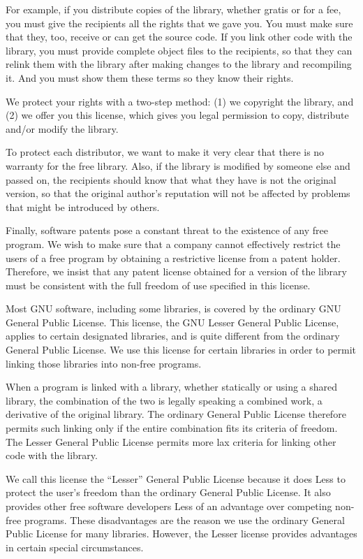 \documentclass[]{article}
\begin{document}
For example, if you distribute copies of the library, whether gratis or
for a fee, you must give the recipients all the rights that we gave you.
You must make sure that they, too, receive or can get the source code.
If you link other code with the library, you must provide complete
object files to the recipients, so that they can relink them with the
library after making changes to the library and recompiling it. And you
must show them these terms so they know their rights.

We protect your rights with a two-step method: (1) we copyright the
library, and (2) we offer you this license, which gives you legal
permission to copy, distribute and/or modify the library.

To protect each distributor, we want to make it very clear that there is
no warranty for the free library. Also, if the library is modified by
someone else and passed on, the recipients should know that what they
have is not the original version, so that the original author's
reputation will not be affected by problems that might be introduced by
others.

Finally, software patents pose a constant threat to the existence of any
free program. We wish to make sure that a company cannot effectively
restrict the users of a free program by obtaining a restrictive license
from a patent holder. Therefore, we insist that any patent license
obtained for a version of the library must be consistent with the full
freedom of use specified in this license.

Most GNU software, including some libraries, is covered by the ordinary
GNU General Public License. This license, the GNU Lesser General Public
License, applies to certain designated libraries, and is quite different
from the ordinary General Public License. We use this license for
certain libraries in order to permit linking those libraries into
non-free programs.

When a program is linked with a library, whether statically or using a
shared library, the combination of the two is legally speaking a
combined work, a derivative of the original library. The ordinary
General Public License therefore permits such linking only if the entire
combination fits its criteria of freedom. The Lesser General Public
License permits more lax criteria for linking other code with the
library.

We call this license the ``Lesser'' General Public License because it
does Less to protect the user's freedom than the ordinary General Public
License. It also provides other free software developers Less of an
advantage over competing non-free programs. These disadvantages are the
reason we use the ordinary General Public License for many libraries.
However, the Lesser license provides advantages in certain special
circumstances.
\end{document}
